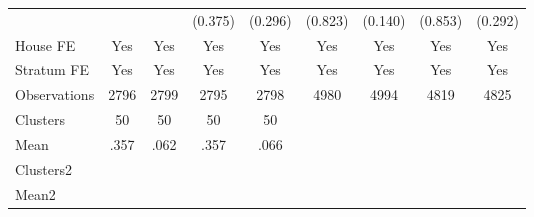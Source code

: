 {\begin{tabular}{l*{8}{c}}
                &                  &                  &  (0.375)         &  (0.296)         &  (0.823)         &  (0.140)         &  (0.853)         &  (0.292)         \\
House FE        &      Yes         &      Yes         &      Yes         &      Yes         &      Yes         &      Yes         &      Yes         &      Yes         \\
Stratum FE      &      Yes         &      Yes         &      Yes         &      Yes         &      Yes         &      Yes         &      Yes         &      Yes         \\
\midrule
Observations    &     2796         &     2799         &     2795         &     2798         &     4980         &     4994         &     4819         &     4825         \\
Clusters        &       50         &       50         &       50         &       50         &                  &                  &                  &                  \\
Mean            &     .357         &     .062         &     .357         &     .066         &                  &                  &                  &                  \\
Clusters2       &                  &                  &                  &                  &                  &                  &                  &                  \\
Mean2           &                  &                  &                  &                  &                  &                  &                  &                  \\
\bottomrule
\end{tabular}
}
